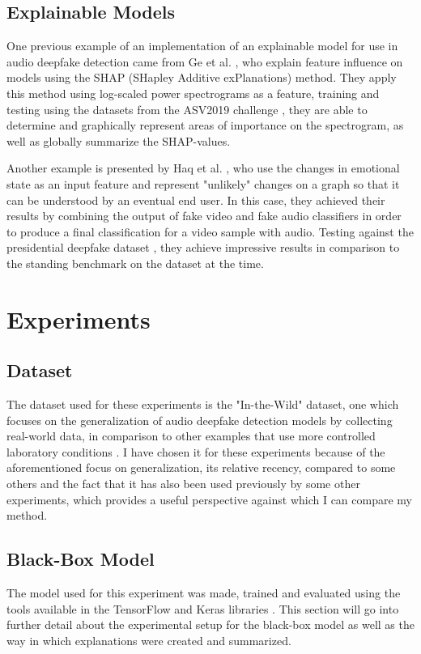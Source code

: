\documentclass{article}
\begin{document}
	\subsection{Explainable Models}
	One previous example of an implementation of an explainable model for use in audio deepfake
	detection came from Ge et al. \cite{ge_explaining_2024}, who explain feature influence on
	models using the SHAP (SHapley Additive exPlanations) method. They apply this method using
	log-scaled power spectrograms as a feature, training and testing using the datasets from the
	ASV2019 challenge \cite{wang_asvspoof_2020}, they are able to determine and graphically
	represent areas of importance on the spectrogram, as well as globally summarize the
	SHAP-values.
	\par
	Another example is presented by Haq et al. \cite{haq_multimodal_2023}, who use
	the changes in emotional state as an input feature and represent "unlikely" changes on a graph
	so that it can be understood by an eventual end user. In this case, they achieved their
	results by combining the output of fake video and fake audio classifiers in order to produce a
	final classification for a video sample with audio. Testing against the presidential deepfake
	dataset \cite{sankaranarayanan_presidential_nodate}, they achieve impressive results in
	comparison to the standing benchmark on the dataset at the time.
	\section{Experiments}
		\subsection{Dataset}
		The dataset used for these experiments is the "In-the-Wild" dataset, one which focuses on
		the generalization of audio deepfake detection models by collecting real-world data, in
		comparison to other examples that use more controlled laboratory conditions
		\cite{muller_does_2022}. I have chosen it for these experiments because of the
		aforementioned focus on generalization, its relative recency, compared to some others and
		the fact that it has also been used previously by some other experiments, which provides a
		useful perspective against which I can compare my method.
		\subsection{Black-Box Model}
		The model used for this experiment was made, trained and evaluated using the tools
		available in the TensorFlow and Keras libraries \cite{tensorflow2015-whitepaper}. This
		section will go into further detail about the experimental setup for the black-box model
		as well as the way in which explanations were created and summarized.
\end{document}
